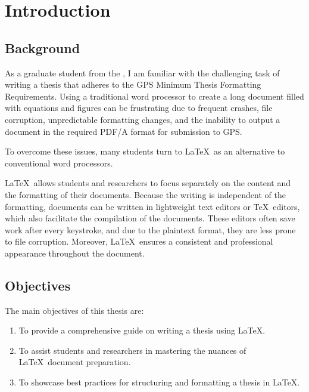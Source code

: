 \chapter{Introduction}\label{ch:Introduction}
	\section{Background}
		As a graduate student from the \UofA, I am familiar with the challenging task of writing a thesis that adheres to the GPS Minimum Thesis Formatting Requirements. 
		Using a traditional word processor to create a long document filled with equations and figures can be frustrating due to frequent crashes, file corruption, unpredictable formatting changes, and the inability to output a document in the required PDF/A format for submission to GPS.
		
		To overcome these issues, many students turn to \LaTeX\ as an alternative to conventional word processors. 
		
		\LaTeX\ allows students and researchers to focus separately on the content and the formatting of their documents. 
		Because the writing is independent of the formatting, documents can be written in lightweight text editors or \TeX\ editors, which also facilitate the compilation of the documents. 
		These editors often save work after every keystroke, and due to the plaintext format, they are less prone to file corruption.
		Moreover, \LaTeX\ ensures a consistent and professional appearance throughout the document. 

	\section{Objectives}
		The main objectives of this thesis are:
		\begin{enumerate}
			\item To provide a comprehensive guide on writing a thesis using \LaTeX.
			\item To assist students and researchers in mastering the nuances of \LaTeX\ document preparation.
			\item To showcase best practices for structuring and formatting a thesis in \LaTeX.
		\end{enumerate}

